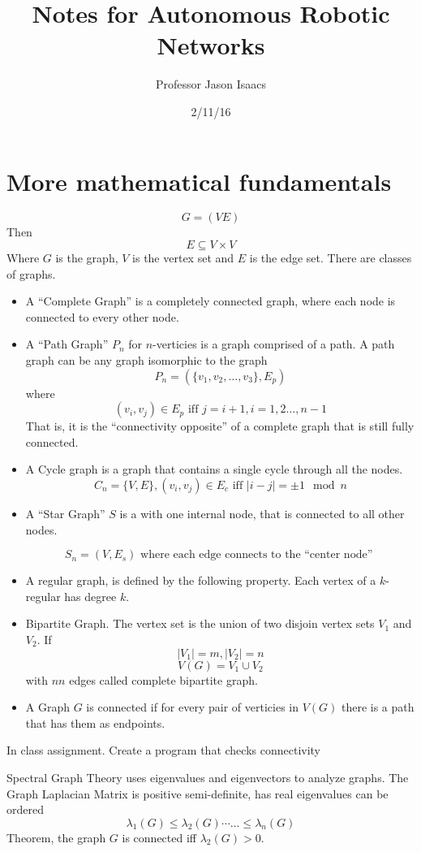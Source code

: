 \documentclass{article}
\title{Notes for Autonomous Robotic Networks}
\author{Professor Jason Isaacs}
\date{2/11/16}
\begin{document}
\maketitle
\section{More mathematical fundamentals}
\[ G=(VE) \]
Then 
\[ E \subseteq V \times V \]
Where $G$ is the graph, $V$ is the vertex set and $E$ is the edge set. 
There are classes of graphs. 
\begin{itemize}
\item A ``Complete Graph'' is a completely connected graph, where each node is
connected to every other node. 
\item A ``Path Graph'' $P_n$ for $n$-verticies is a graph comprised of a path. A
path graph can be any graph isomorphic to the graph
\[ P_n = (\{v_1, v_2,\ldots,v_3\},E_p) \]
where 
\[ (v_i, v_j) \in E_p \text{ iff } j = i+1, i = 1,2\ldots, n-1 \]
That is, it is the ``connectivity opposite'' of a complete graph that is still
fully connected.

\item A Cycle graph is a graph that contains a single cycle through all the
nodes. 
\[ C_n = \{V, E \}, (v_i,v_j)\in E_c \text{ iff } |i-j| = \pm 1 \mod n \]

\item A ``Star Graph'' $S$ is a with one internal node, that is connected to all
other nodes. 

\[ S_n = (V,E_s) \text{ where each edge connects to the ``center node'' } \]

\item A regular graph, is defined by the following property. Each vertex of a $k$-regular has degree $k$. 

\item Bipartite Graph. The vertex set is the union of two disjoin vertex sets
$V_1$ and $V_2$. 
If 
\[ |V_1| = m, |V_2| = n \]
\[ V(G) = V_1 \cup V_2 \]
with $nn$ edges called complete bipartite graph. 

\item A Graph $G$ is connected if for every pair of verticies in $V(G)$ there is
a path that has them as endpoints. 

\end{itemize}

In class assignment. Create a program that checks connectivity

Spectral Graph Theory uses eigenvalues and eigenvectors to analyze graphs. The
Graph Laplacian Matrix is positive semi-definite, has real eigenvalues can be
ordered
\[ \lambda_1(G) \leq \lambda_2(G) \cdots \ldots \leq \lambda_n(G) \]
Theorem, the graph $G$ is connected iff $\lambda_2(G) > 0$. 
\end{document}
